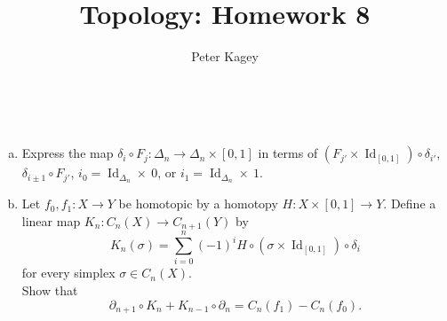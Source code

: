 \documentclass{article}
\newenvironment{problem}[2][Problem]{\begin{trivlist}
\item[\hskip \labelsep {\bfseries #1}\hskip \labelsep {\bfseries #2.}]}{\end{trivlist}}
\newcommand{\fn}[3]{#1 \colon #2 \rightarrow #3}
\newcommand{\id}[1]{\operatorname{Id}_{#1}}
\begin{document}
\title{Topology: Homework 8}
\author{Peter Kagey}

\maketitle

\begin{problem}{1} \text{} \\
  \begin{enumerate}[a.]
    \item Express the map
    $\fn{\delta_i \circ F_j}{\Delta_n}{\Delta_n \times [0, 1]}$
    in terms of
    $(F_{j'} \times \id{[0,1]}) \circ \delta_{i'}$,
    $\delta_{i\pm1} \circ F_{j'}$, $i_0 = \id{\Delta_n} \times ~ 0$, or $i_1 = \id{\Delta_n} \times ~ 1$.
    \item Let $\fn{f_0, f_1}{X}{Y}$ be homotopic by a homotopy
    $\fn{H}{X \times [0, 1]}{Y}$. Define a linear map $\fn{K_n}{C_n(X)}{C_{n+1}(Y)}$ by \[
      K_n(\sigma) = \sum_{i=0}^{n} (-1)^{i} H\circ(\sigma \times \id{[0,1]}) \circ \delta_i
    \] for every simplex $\sigma \in C_n(X)$.\\
    Show that \[
      \partial_{n+1} \circ K_n + K_{n - 1} \circ \partial_n
      = C_n(f_1) - C_n(f_0).
    \]
  \end{enumerate}
\end{problem}
\end{document}
